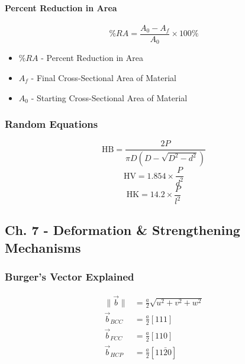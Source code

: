 			\paragraph{Percent Reduction in Area} \label{par:Percent Reduction Area}
				\begin{equation} \label{eq:Percent Reduction Area}
					\%RA = \frac{A_{0} - A_{f}}{A_{0}} \times 100\%
				\end{equation}
				\begin{itemize}[noitemsep]
					\item $\%RA$ - Percent Reduction in Area
					\item $A_{f}$ - Final Cross-Sectional Area of Material
					\item $A_{0}$ - Starting Cross-Sectional Area of Material
				\end{itemize}
		
		\subsubsection{Random Equations}
			\begin{equation}
				\text{HB} = \frac{2P}{\pi D \left( D - \sqrt{D^{2} - d^{2}} \right)}
			\end{equation}
			\begin{equation}
				\text{HV} = 1.854 \times \frac{P}{d^{2}}
			\end{equation}
			\begin{equation}
				\text{HK} = 14.2 \times \frac{P}{l^{2}}
			\end{equation}
			
	\subsection{Ch. 7 - Deformation \& Strengthening Mechanisms} \label{subsec:Ch 7}
		\subsubsection{Burger's Vector Explained} \label{subsubsec:Burgers Vector Explained}
			\begin{equation}
				\begin{aligned}
					\lVert \vec{b} \rVert &= \frac{a}{2} \sqrt{u^{2} + v^{2} + w^{2}} \\
					\vec{b}_{BCC} &= \frac{a}{2} \left[ 111 \right] \\
					\vec{b}_{FCC} &= \frac{a}{2} \left[ 110 \right] \\
					\vec{b}_{HCP} &= \frac{a}{2} \left[ 11 \bar{2} 0 \right] \\
				\end{aligned}
			\end{equation}
			
